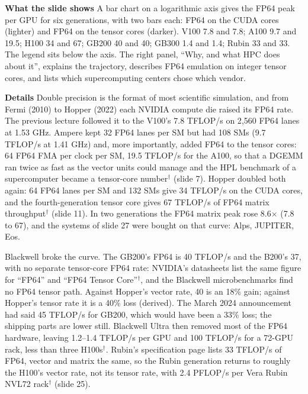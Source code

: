 \documentclass[11pt,letterpaper]{article}
\newcommand{\para}[1]{\medskip\noindent\textbf{#1}\quad}
\begin{document}
\para{What the slide shows} A bar chart on a logarithmic axis gives the FP64 peak per GPU for six generations, with two bars each: FP64 on the CUDA cores (lighter) and FP64 on the tensor cores (darker). V100 7.8 and 7.8; A100 9.7 and 19.5; H100 34 and 67; GB200 40 and 40; GB300 1.4 and 1.4; Rubin 33 and 33. The legend sits below the axis. The right panel, ``Why, and what HPC does about it'', explains the trajectory, describes FP64 emulation on integer tensor cores, and lists which supercomputing centers chose which vendor.

\para{Details} Double precision is the format of most scientific simulation, and from Fermi (2010) to Hopper (2022) each NVIDIA compute die raised its FP64 rate. The previous lecture followed it to the V100's 7.8 TFLOP/s on 2{,}560 FP64 lanes at 1.53 GHz. Ampere kept 32 FP64 lanes per SM but had 108 SMs (9.7 TFLOP/s at 1.41 GHz) and, more importantly, added FP64 to the tensor cores: 64 FP64 FMA per clock per SM, 19.5 TFLOP/s for the A100, so that a DGEMM ran twice as fast as the vector units could manage and the HPL benchmark of a supercomputer became a tensor-core number$^\dagger$ (slide 7). Hopper doubled both again: 64 FP64 lanes per SM and 132 SMs give 34 TFLOP/s on the CUDA cores, and the fourth-generation tensor core gives 67 TFLOP/s of FP64 matrix throughput$^\dagger$ (slide 11). In two generations the FP64 matrix peak rose 8.6$\times$ (7.8 to 67), and the systems of slide 27 were bought on that curve: Alps, JUPITER, Eos.

Blackwell broke the curve. The GB200's FP64 is 40 TFLOP/s and the B200's 37, with no separate tensor-core FP64 rate: NVIDIA's datasheets list the same figure for ``FP64'' and ``FP64 Tensor Core''$^\dagger$, and the Blackwell microbenchmarks find no FP64 tensor path. Against Hopper's vector rate, 40 is an 18\% gain; against Hopper's tensor rate it is a 40\% loss (derived). The March 2024 announcement had said 45 TFLOP/s for GB200, which would have been a 33\% loss; the shipping parts are lower still. Blackwell Ultra then removed most of the FP64 hardware, leaving 1.2--1.4 TFLOP/s per GPU and 100 TFLOP/s for a 72-GPU rack, less than three H100s$^\dagger$. Rubin's specification page lists 33 TFLOP/s of FP64, vector and matrix the same, so the Rubin generation returns to roughly the H100's vector rate, not its tensor rate, with 2.4 PFLOP/s per Vera Rubin NVL72 rack$^\dagger$ (slide 25).
\end{document}
